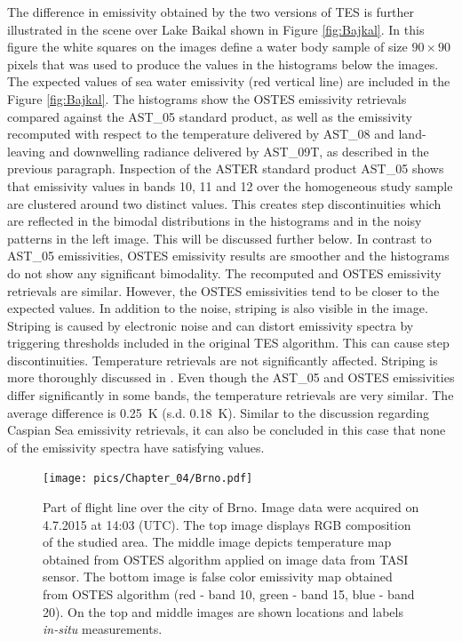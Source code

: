 The difference in emissivity obtained by the two versions of TES is further illustrated in the scene over Lake Baikal shown in Figure \ref{fig:Bajkal}. In this figure the white squares on the images define a water body sample of size $90 \times 90$ pixels that was used to produce the values in the histograms below the images. The expected values of sea water emissivity (red vertical line) are included in the Figure \ref{fig:Bajkal}. The histograms show the OSTES emissivity retrievals compared against the AST\_05 standard product, as well as the emissivity recomputed with respect to the temperature delivered by AST\_08 and land-leaving and downwelling radiance delivered by AST\_09T, as described in the previous paragraph. Inspection of the ASTER standard product AST\_05 shows that emissivity values in bands 10, 11 and 12 over the homogeneous study sample are clustered around two distinct values. This creates step discontinuities which are reflected in the bimodal distributions in the histograms and in the noisy patterns in the left image. This will be discussed further below. In contrast to AST\_05 emissivities, OSTES emissivity results are smoother and the histograms do not show any significant bimodality. The recomputed and OSTES emissivity retrievals are similar. However, the OSTES emissivities tend to be closer to the expected values. In addition to the noise, striping is also visible in the image. Striping is caused by electronic noise and can distort emissivity spectra by triggering thresholds included in the original TES algorithm. This can cause step discontinuities. Temperature retrievals are not significantly affected. Striping is more thoroughly discussed in \cite{GA11}. Even though the AST\_05 and OSTES emissivities differ significantly in some bands, the temperature retrievals are very similar. The average difference is \SI{0.25}{\kelvin} (s.d. \SI{0.18}{\kelvin}). Similar to the discussion regarding Caspian Sea emissivity retrievals, it can also be concluded in this case that none of the emissivity spectra have satisfying values.

\begin{figure}[!t]
\centering
\vspace{0.8 em}
\texttt{[image: pics/Chapter\_04/Brno.pdf]}
\vspace{2 em}
\caption{
Part of flight line over the city of Brno. Image data were acquired on 4.7.2015 at 14:03 (UTC). The top image displays RGB composition of the studied area. The middle image depicts temperature map obtained from OSTES algorithm applied on image data from TASI sensor. The bottom image is false color emissivity map obtained from OSTES algorithm (red - band 10, green - band 15, blue - band 20). On the top and middle images are shown locations and labels \textit{in-situ} measurements.}
\label{fig:Brno}
\end{figure}


